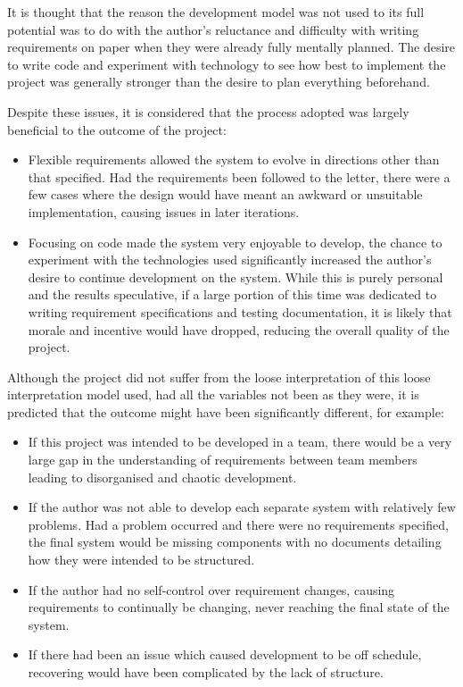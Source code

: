 \documentclass[a4papert,11pt,notitlepage]{article}
\begin{document}
It is thought that the reason the development model was not used to its full potential was to do with the author's reluctance and difficulty with writing requirements on paper when they were already fully mentally planned. The desire to write code and experiment with technology to see how best to implement the project was generally stronger than the desire to plan everything beforehand.

Despite these issues, it is considered that the process adopted was largely beneficial to the outcome of the project:
\begin{itemize}
\item Flexible requirements allowed the system to evolve in directions other than that specified. Had the requirements been followed to the letter, there were a few cases where the design would have meant an awkward or unsuitable implementation, causing issues in later iterations.
\item Focusing on code made the system very enjoyable to develop, the chance to experiment with the technologies used significantly increased the author's desire to continue development on the system. While this is purely personal and the results speculative, if a large portion of this time was dedicated to writing requirement specifications and testing documentation, it is likely that morale and incentive would have dropped, reducing the overall quality of the project.
\end{itemize}

Although the project did not suffer from the loose interpretation of this loose interpretation model used, had all the variables not been as they were, it is predicted that the outcome might have been significantly different, for example:
\begin{itemize}
\item If this project was intended to be developed in a team, there would be a very large gap in the understanding of requirements between team members leading to disorganised and chaotic development.
\item If the author was not able to develop each separate system with relatively few problems. Had a problem occurred and there were no requirements specified, the final system would be missing components with no documents detailing how they were intended to be structured.
\item If the author had no self-control over requirement changes, causing requirements to continually be changing, never reaching the final state of the system.
\item If there had been an issue which caused development to be off schedule, recovering would have been complicated by the lack of structure.
\end{itemize}
\end{document}
